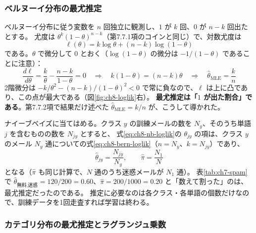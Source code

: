 \subsubsection{ベルヌーイ分布の最尤推定}

ベルヌーイ分布に従う変数を $n$ 回独立に観測し、$1$ が $k$ 回、$0$ が $n - k$ 回出たとする。
尤度は $\theta^k(1 - \theta)^{n-k}$（第7.7.1項のコインと同じ）で、対数尤度は
\begin{equation}
  \ell(\theta) = k \log \theta + (n - k)\log(1 - \theta)
  \label{eq:ch8-bern-loglik}
\end{equation}
である。$\theta$ で微分して $0$ とおく（$\log(1 - \theta)$ の微分は $-1/(1 - \theta)$ であることに注意）：
\begin{equation}
  \frac{d\ell}{d\theta} = \frac{k}{\theta} - \frac{n - k}{1 - \theta} = 0
  \quad\Longrightarrow\quad
  k(1 - \theta) = (n - k)\theta
  \quad\Longrightarrow\quad
  \hat{\theta}_{\mathrm{MLE}} = \frac{k}{n}
  \label{eq:ch8-bern-mle}
\end{equation}
2階微分は $-k/\theta^2 - (n - k)/(1 - \theta)^2 < 0$ で常に負なので、$\ell$ は上に凸であり、この点が最大である（図\ref{fig:ch8-loglik}右）。
\textbf{最尤推定は「$1$ が出た割合」である}。第7.7.2項で結果だけ述べた $\hat{\theta}_{\mathrm{MLE}} = k/n$ が、こうして導かれた。

ナイーブベイズに当てはめる。クラス $y$ の訓練メールの数を $N_y$、そのうち単語 $j$ を含むものの数を $N_{jy}$ とすると、
式\eqref{eq:ch8-nb-loglik}の $\theta_{jy}$ の項は、クラス $y$ のメール $N_y$ 通についての式\eqref{eq:ch8-bern-loglik}（$n = N_y$、$k = N_{jy}$）であり、
\begin{equation}
  \hat{\theta}_{jy} = \frac{N_{jy}}{N_y},
  \qquad
  \hat{\pi} = \frac{N_1}{N}
  \label{eq:ch8-nb-mle}
\end{equation}
となる（$\hat{\pi}$ も同じ計算で、$N$ 通のうち迷惑メールが $N_1$ 通）。
表\ref{tab:ch7-spam}で $\hat{\theta}_{\text{無料},\text{迷惑}} = 120/200 = 0.60$、$\hat{\pi} = 200/1000 = 0.20$ と「数えて割った」のは、最尤推定だったのである。
推定に必要なのは各クラス・各単語の個数だけなので、訓練データを1回走査すれば学習は終わる。

\subsubsection{カテゴリ分布の最尤推定とラグランジュ乗数}

